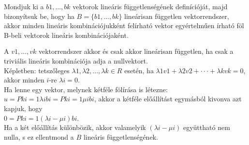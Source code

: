 \begin{frame}
  \begin{tcolorbox}[title={1. (4p)}]
    Mondjuk ki a $b1,...,bk$ vektorok lineáris függetlenségének definícióját, majd bizonyítsuk be, hogy ha $B = \{b1,...,bk\}$ lineárisan független vektorrendszer, akkor minden lineáris kombinációjukként felírható vektor egyértelműen írható föl B-beli vektorok lineáris kombinációjaként.
  \tcblower
  
    A $v1,...,vk$ vektorrendszer akkor és csak akkor lineárisan független, ha csak a triviális lineáris kombinációja adja a nullvektort.\\

    Képletben: tetszőleges ${\lambda}1,{\lambda}2,...,{\lambda}k \in R$ esetén, ha ${\lambda}1v1 + {\lambda}2v2 +  \cdot  \cdot  \cdot  + {\lambda}kvk = 0$, akkor minden $i$-re ${\lambda}i = 0$.\\

    Ha lenne egy vektor, melynek kétféle fölírása is létezne: $u = Pk i=1 {\lambda}ibi = Pk i=1 {\mu}ibi$, akkor a kétféle előállítást egymásból kivonva azt kapjuk, hogy\\

    $0 = Pk i=1({\lambda}i -{\mu}i)bi$.\\

    Ha a két előállítás különbözik, akkor valamelyik $({\lambda}i-{\mu}i)$ együttható nem nulla, s ez ellentmond a $B$ lineáris függetlenségének.
  \end{tcolorbox}
\end{frame}


